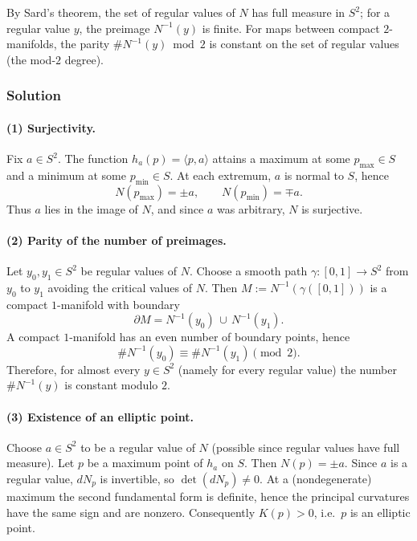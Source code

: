 \documentclass[12pt,a4paper]{article}
\theoremstyle{plain}
\theoremstyle{definition}      %
\begin{document}
	By Sard's theorem, the set of regular values of $N$ has full measure in $S^2$; for a regular value
	$y$, the preimage $N^{-1}(y)$ is finite.
	For maps between compact $2$-manifolds, the parity $\#N^{-1}(y)\bmod 2$ is constant on the set
	of regular values (the mod-$2$ degree).
	
	\subsubsection*{Solution}

	\paragraph{(1) Surjectivity.}
	Fix $a\in S^2$. The function $h_a(p)=\langle p,a\rangle$ attains a maximum at some $p_{\max}\in S$
	and a minimum at some $p_{\min}\in S$.
	At each extremum, $a$ is normal to $S$, hence
	\[
	N(p_{\max})=\pm a,\qquad N(p_{\min})=\mp a.
	\]
	Thus $a$ lies in the image of $N$, and since $a$ was arbitrary, $N$ is surjective.
	
	\paragraph{(2) Parity of the number of preimages.}
	Let $y_0,y_1\in S^2$ be regular values of $N$. Choose a smooth path $\gamma:[0,1]\to S^2$
	from $y_0$ to $y_1$ avoiding the critical values of $N$.
	Then $M:=N^{-1}(\gamma([0,1]))$ is a compact $1$-manifold with boundary
	\[
	\partial M = N^{-1}(y_0)\,\cup\,N^{-1}(y_1).
	\]
	A compact $1$-manifold has an even number of boundary points, hence
	\[
	\#N^{-1}(y_0)\equiv \#N^{-1}(y_1)\pmod 2.
	\]
	Therefore, for almost every $y\in S^2$ (namely for every regular value) the number $\#N^{-1}(y)$
	is constant modulo $2$.
	
	\paragraph{(3) Existence of an elliptic point.}
	Choose $a\in S^2$ to be a regular value of $N$ (possible since regular values have full measure).
	Let $p$ be a maximum point of $h_a$ on $S$. Then $N(p)=\pm a$.
	Since $a$ is a regular value, $dN_p$ is invertible, so $\det(dN_p)\neq 0$.
	At a (nondegenerate) maximum the second fundamental form is definite, hence the principal curvatures
	have the same sign and are nonzero. Consequently $K(p)>0$, i.e.\ $p$ is an elliptic point.
	
\end{document}
